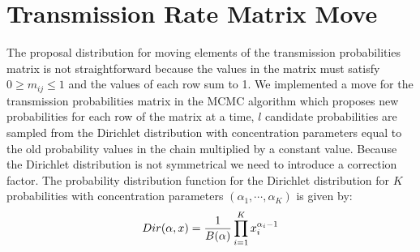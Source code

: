 \documentclass[11pt,a4paper]{report}
\begin{document}
\section{Transmission Rate Matrix Move}
The proposal distribution for moving elements of the transmission probabilities matrix is not straightforward because the values in the matrix must satisfy $0 \geq m_{ij} \leq 1$ and the values of each row sum to 1. We implemented a move for the transmission probabilities matrix in the MCMC algorithm which proposes new probabilities for each row of the matrix at a time, $l$ candidate probabilities are sampled from the Dirichlet distribution with concentration parameters equal to the old probability values in the chain multiplied by a constant value. Because the Dirichlet distribution is not symmetrical we need to introduce a correction factor. The probability distribution function for the Dirichlet distribution for $K$ probabilities with concentration parameters $(\alpha_1,\cdots,\alpha_K)$ is given by:
\begin{equation}
Dir(\alpha,x) = \frac{1}{B( {\bf \alpha} )}\prod_{i=1}^{K} x_{i}^{\alpha_{i} - 1}
\end{equation}
\end{document}
